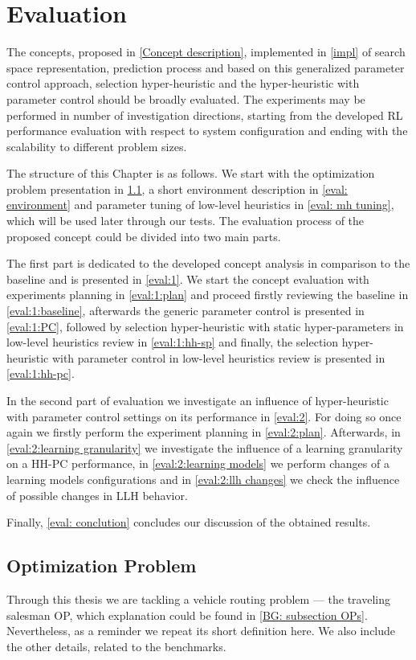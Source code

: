 \chapter{Evaluation}\label{eval}
The concepts, proposed in \cref{Concept description}, implemented in \cref{impl} of search space representation, prediction process and based on this generalized parameter control approach, selection hyper-heuristic and the hyper-heuristic with parameter control should be broadly evaluated. The experiments may be performed in number of investigation directions, starting from the developed RL performance evaluation with respect to system configuration and ending with the scalability to different problem sizes.

The structure of this Chapter is as follows. We start with the optimization problem presentation in \cref{eval: op}, a short environment description in \cref{eval: environment} and parameter tuning of low-level heuristics in \cref{eval: mh tuning}, which will be used later through our tests. The evaluation process of the proposed concept could be divided into two main parts. 

The first part is dedicated to the developed concept analysis in comparison to the baseline and is presented in \cref{eval:1}. We start the concept evaluation with experiments planning in \cref{eval:1:plan} and proceed firstly reviewing the baseline in \cref{eval:1:baseline}, afterwards the generic parameter control is presented in \cref{eval:1:PC}, followed by selection hyper-heuristic with static hyper-parameters in low-level heuristics review in \cref{eval:1:hh-sp} and finally, the selection hyper-heuristic with parameter control in low-level heuristics review is presented in \cref{eval:1:hh-pc}.

In the second part of evaluation we investigate an influence of hyper-heuristic with parameter control settings on its performance in \cref{eval:2}. For doing so once again we firstly perform the experiment planning in \cref{eval:2:plan}. Afterwards, in \cref{eval:2:learning granularity} we investigate the influence of a learning granularity on a HH-PC performance, in \cref{eval:2:learning models} we perform changes of a learning models configurations and in \cref{eval:2:llh changes} we check the influence of possible changes in LLH behavior.

Finally, \cref{eval: conclution} concludes our discussion of the obtained results.


\section{Optimization Problem}\label{eval: op}
Through this thesis we are tackling a vehicle routing problem — the traveling salesman OP, which explanation could be found in \cref{BG: subsection OPs}. Nevertheless, as a reminder we repeat its short definition here. We also include the other details, related to the benchmarks.

